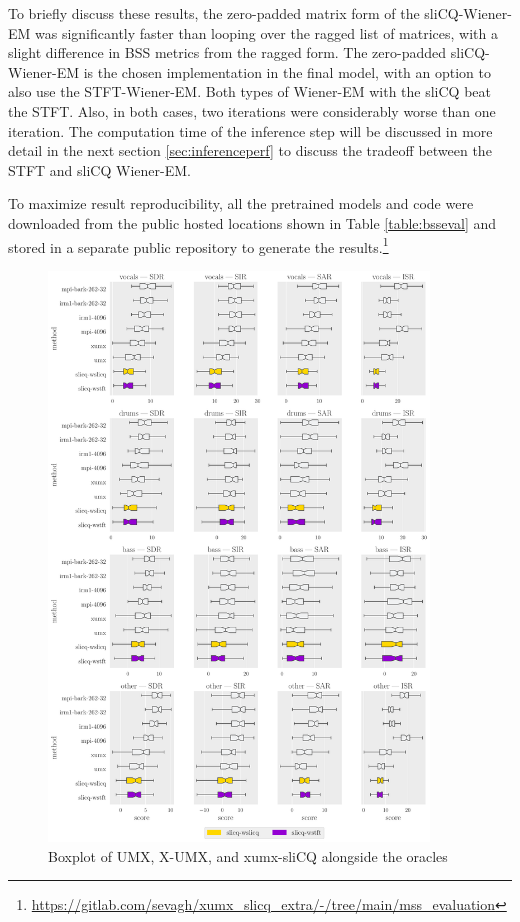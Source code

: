 \documentclass[report.tex]{subfiles}
\begin{document}
To briefly discuss these results, the zero-padded matrix form of the sliCQ-Wiener-EM was significantly faster than looping over the ragged list of matrices, with a slight difference in BSS metrics from the ragged form. The zero-padded sliCQ-Wiener-EM is the chosen implementation in the final model, with an option to also use the STFT-Wiener-EM. Both types of Wiener-EM with the sliCQ beat the STFT. Also, in both cases, two iterations were considerably worse than one iteration. The computation time of the inference step will be discussed in more detail in the next section \ref{sec:inferenceperf} to discuss the tradeoff between the STFT and sliCQ Wiener-EM.

To maximize result reproducibility, all the pretrained models and code were downloaded from the public hosted locations shown in Table \ref{table:bsseval} and stored in a separate public repository to generate the results.\footnote{\url{https://gitlab.com/sevagh/xumx_slicq_extra/-/tree/main/mss_evaluation}}

\begin{figure}[ht]
	\centering
	\includegraphics[width=0.9\textwidth]{./images-bss/boxplot_full.pdf}
	\caption{Boxplot of UMX, X-UMX, and xumx-sliCQ alongside the oracles}
	\label{fig:bssboxplot}
\end{figure}
\end{document}
